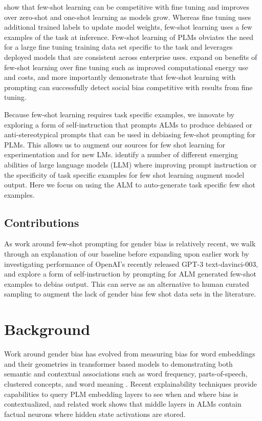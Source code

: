\documentclass[11pt]{article}
\begin{document}
\citealt{brown2020language:20} show that few-shot learning can be competitive with fine tuning and improves over zero-shot and one-shot learning as models grow. Whereas fine tuning uses additional trained labels to update model weights, few-shot learning uses a few examples of the task at inference. Few-shot learning of PLMs obviates the need for a large fine tuning training data set specific to the task and leverages deployed models that are consistent across enterprise uses. \citealp{Prabhumoye-fewshotprompts-2021:21} expand on benefits of few-shot learning over fine tuning such as improved computational energy use and costs, and more importantly demonstrate that few-shot learning with prompting can successfully detect social bias competitive with results from fine tuning.

Because few-shot learning requires task specific examples, we innovate by exploring a form of self-instruction that prompts ALMs to produce debiased or anti-stereotypical prompts that can be used in debiasing few-shot prompting for PLMs. This allows us to augment our sources for few shot learning for experimentation and for new LMs. \citealp{wei2022emergent:22} identify a number of different emerging abilities of large language models (LLM) where improving prompt instruction or the specificity of  task specific examples for few shot learning augment model output. Here we focus on using the ALM to auto-generate task specific few shot examples.

\subsection{Contributions}
As work around few-shot prompting for gender bias is relatively recent, we walk through an explanation of our baseline before expanding upon earlier work by investigating performance of OpenAI's recently released GPT-3 text-davinci-003, and explore a form of self-instruction by prompting for ALM generated few-shot examples to debias output. This can serve as an alternative to human curated sampling to augment the lack of gender bias few shot data sets in the literature.

\section{Background}

Work around gender bias has evolved from measuring bias for word embeddings \citep{bolukbasi2016man:16} and their geometries in transformer based models \citep{ethayarajh2019contextual:19} to demonstrating both semantic and contextual associations such as word frequency, parts-of-speech, clustered concepts, and word meaning \citep{caliskan2022gender:22}. Recent explainability techniques \citep{friedrich2021interactively:21, tenney2020language:20} provide capabilities to query PLM embedding layers to see when and where bias is contextualized, and related work shows that middle layers in ALMs contain factual neurons \citep{meng2022locating:22} where hidden state activations are stored.
\end{document}
